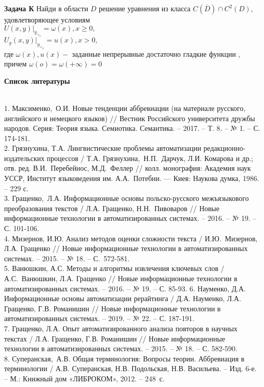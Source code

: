 \documentclass[a4paper, 12pt]{article}
\begin{document}
\textbf{Задача К} Найди в области $D$  решение уравнения из класса  $ C(\overline D) \cap  C^2 (D)$, удовлетворяющее условиям \\
$
U(x,y)|_y_=_o=\omega(x),x \geq 0, 
$ \\
$
U_y(x,y)|_y_=_o=u(x),x > 0, 
$ \\
где $\omega (x), u(x) -$ заданные непрерывные достаточно гладкие функции    , причем $ \omega (o) = \omega (+\infty) =0$
\begin{center}
    \textbf{Список литературы}
\end{center} \\
1. Максименко, О.И. Новые тенденции аббревиации (на материале русского, английского и немецкого языков) // Вестник Российского университета дружбы народов. Серия: Теория языка. Семиотика. Семантика. – 2017. – Т. 8. – № 1. – С. 174-181.\\
2. Грязнухина, Т.А. Лингвистические проблемы автоматизации редакционно-издательских процессов / Т.А. Грязнухина, Н.П. Дарчук, Л.И. Комарова и др.; отв. ред. В.И. Перебейнос, М.Д. Феллер // колл. монография: Академия наук УССР, Институт языковедения им. А.А. Потебни. — Киев: Наукова думка, 1986. – 229 с.\\
3. Гращенко, Л.А. Информационные основы польско-русского межъязыкового преобразования текстов / Л.А. Гращенко, Н.Н. Пивоваров // Новые информационные технологии в автоматизированных системах. – 2016. – № 19. – С. 101-106.\\
4. Мизернов, И.Ю. Анализ методов оценки сложности текста / И.Ю. Мизернов, Л.А. Гращенко // Новые информационные технологии в автоматизированных системах. – 2015. – № 18. – С. 572-581.\\
5. Ванюшкин, А.С. Методы и алгоритмы извлечения ключевых слов / А.С. Ванюшкин, Л.А. Гращенко // Новые информационные технологии в автоматизированных системах. – 2016. – № 19. – С. 85-93.
6. Науменко, Д.А. Информационные основы автоматизации рерайтинга / Д.А. Науменко, Л.А. Гращенко, Г.В. Романишин // Новые информационные технологии в автоматизированных системах. – 2019. – № 22. – С. 187-191.\\
7. Гращенко, Л.А. Опыт автоматизированного анализа повторов в научных текстах / Л.А. Гращенко, Г.В. Романишин // Новые информационные технологии в автоматизированных системах. – 2015. – № 18. – С. 582-590.\\
8. Суперанская, А.В. Общая терминология: Вопросы теории. Аббревиация в терминологии / А.В. Суперанская, Н.В. Подольская, Н.В. Васильева. – Изд. 6-е. – М.: Книжный дом «ЛИБРОКОМ», 2012. – 248 с.\\
\end{document}
